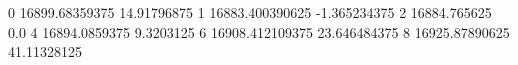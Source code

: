 0 16899.68359375 14.91796875
1 16883.400390625 -1.365234375
2 16884.765625 0.0
4 16894.0859375 9.3203125
6 16908.412109375 23.646484375
8 16925.87890625 41.11328125
